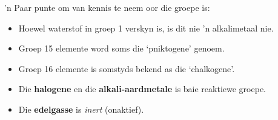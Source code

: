  'n Paar punte om van kennis te neem oor die groepe is:
        \label{m38757*id261581}\begin{itemize}[noitemsep]
            \label{m38757*uid135}\item Hoewel waterstof in groep 1 verskyn is, is dit nie 'n alkalimetaal nie.
\item Groep 15 elemente word soms die ‘pniktogene’ genoem.
\label{m38757*id6232}\item Groep 16 elemente is somstyds bekend as die ‘chalkogene’.
\label{m38757*uid142}\item Die \textbf{halogene} en die \textbf{alkali-aardmetale} is baie reaktiewe groepe.
\label{m38757*uid143}\item Die \textbf{edelgasse} is \textsl{inert} (onaktief).   
\end{itemize}            


